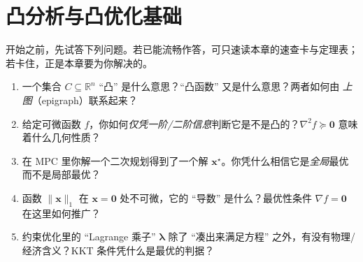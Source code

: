 \chapter{凸分析与凸优化基础}
\label{ch:convex}


\begin{practice}[前置自测]
开始之前，先试答下列问题。若已能流畅作答，可只速读本章的速查卡与定理表；若卡住，正是本章要为你解决的。
\begin{enumerate}
  \item 一个集合 $C\subseteq\mathbb{R}^n$ “凸” 是什么意思？“凸函数” 又是什么意思？两者如何由 \emph{上图}（epigraph）联系起来？
  \item 给定可微函数 $f$，你如何\emph{仅凭一阶/二阶信息}判断它是不是凸的？$\nabla^2 f\succeq\mathbf 0$ 意味着什么几何性质？
  \item 在 MPC 里你解一个二次规划得到了一个解 $\mathbf x^\star$。你凭什么相信它是\emph{全局}最优而不是局部最优？
  \item 函数 $\|\mathbf x\|_1$ 在 $\mathbf x=\mathbf 0$ 处不可微，它的 “导数” 是什么？最优性条件 $\nabla f=\mathbf 0$ 在这里如何推广？
  \item 约束优化里的 “Lagrange 乘子” $\boldsymbol\lambda$ 除了 “凑出来满足方程” 之外，有没有物理/经济含义？KKT 条件凭什么是最优的判据？
\end{enumerate}
\end{practice}

